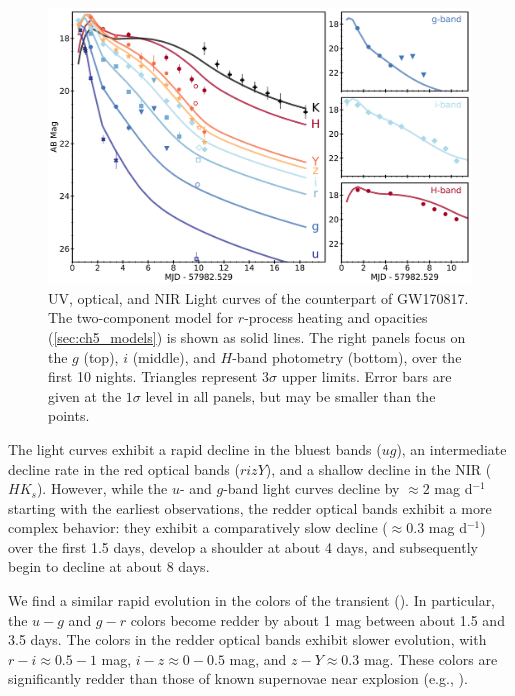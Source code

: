 \begin{figure}[!t]
\begin{center}
\includegraphics[width=\textwidth]{./figs/chapter5/DECam_lc_alt.pdf}
\caption{\singlespace UV, optical, and NIR Light curves of the counterpart of GW170817. The two-component model for $r$-process heating and opacities (\cref{sec:ch5_models}) is shown as solid lines. The right panels focus on the $g$ (top), $i$ (middle), and $H$-band photometry (bottom), over the first 10 nights. Triangles represent 3$\sigma$ upper limits. Error bars are given at the $1\sigma$ level in all panels, but may be smaller than the points.}
\label{fig:ch5_lc_good}
\end{center}
\end{figure}

The light curves exhibit a rapid decline in the bluest bands ($ug$), an intermediate decline rate in the red optical bands ($rizY$), and a shallow decline in the NIR ($HK_s$).  However, while the $u$- and $g$-band light curves decline by $\approx 2$ mag d$^{-1}$ starting with the earliest observations, the redder optical bands exhibit a more complex behavior: they exhibit a comparatively slow decline ($\approx0.3$ mag d$^{-1}$) over the first 1.5 days, develop a shoulder at about 4 days, and subsequently begin to decline at about 8 days.

We find a similar rapid evolution in the colors of the transient ().  In particular, the $u-g$ and $g-r$ colors become redder by about 1 mag between about 1.5 and 3.5 days.  The colors in the redder optical bands exhibit slower evolution, with $r-i\approx 0.5-1$ mag, $i-z\approx 0-0.5$ mag, and $z-Y\approx 0.3$ mag.  These colors are significantly redder than those of known supernovae near explosion (e.g., \citealt{Folatelli+10,Bianco+14,Galbany+16}).

